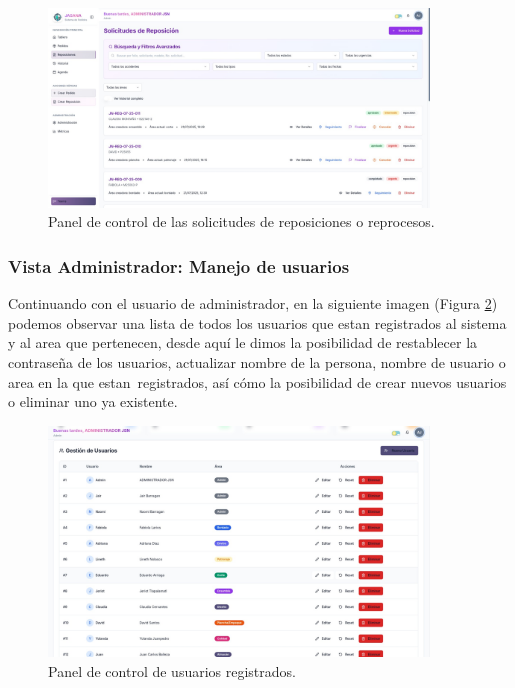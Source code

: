\documentclass[12pt,letterpaper,spanish]{report}
\begin{document}
\begin{figure}[H]
    \centering
    \includegraphics[width=0.9\textwidth]{pantalla_admin.jpg}
    \caption{Panel de control de las solicitudes de reposiciones o reprocesos.}
    \label{fig:adminscreen}
\end{figure}

\subsubsection{Vista Administrador: Manejo de usuarios}
Continuando con el usuario de administrador, en la siguiente imagen (Figura \ref{fig:usersadminscreen}) podemos observar una lista de todos los usuarios que estan registrados al sistema y al area que pertenecen, desde aquí le dimos la posibilidad de restablecer la contraseña de los usuarios, actualizar nombre de la persona, nombre de usuario o area en la que estan registrados, así cómo la posibilidad de crear nuevos usuarios o eliminar uno ya existente.

\begin{figure}[H]
    \centering
    \includegraphics[width=0.9\textwidth]{admin_usuarios.jpg}
    \caption{Panel de control de usuarios registrados.}
    \label{fig:usersadminscreen}
\end{figure}
\end{document}
